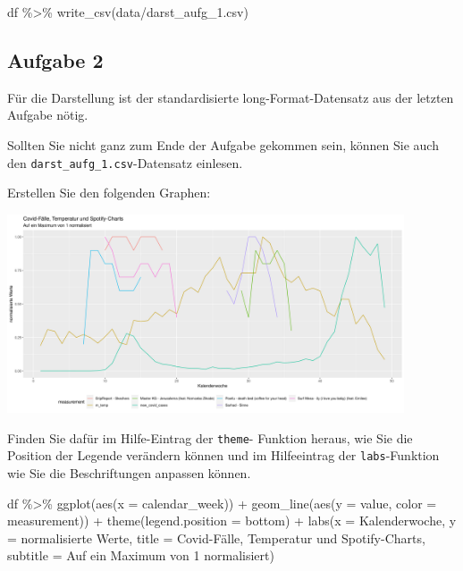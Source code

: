 \documentclass[
]{book}
\newenvironment{Shaded}{\begin{snugshade}}{\end{snugshade}}
\newcommand{\AttributeTok}[1]{\textcolor[rgb]{0.77,0.63,0.00}{#1}}
\newcommand{\FunctionTok}[1]{\textcolor[rgb]{0.00,0.00,0.00}{#1}}
\newcommand{\NormalTok}[1]{#1}
\newcommand{\SpecialCharTok}[1]{\textcolor[rgb]{0.00,0.00,0.00}{#1}}
\newcommand{\StringTok}[1]{\textcolor[rgb]{0.31,0.60,0.02}{#1}}
\begin{document}
\begin{Shaded}
\begin{Highlighting}[]
\NormalTok{df }\SpecialCharTok{\%\textgreater{}\%} 
  \FunctionTok{write\_csv}\NormalTok{(}\StringTok{\textquotesingle{}data/darst\_aufg\_1.csv\textquotesingle{}}\NormalTok{)}
\end{Highlighting}
\end{Shaded}

\hypertarget{aufgabe-2-4}{%
\subsection{Aufgabe 2}\label{aufgabe-2-4}}

Für die Darstellung ist der standardisierte long-Format-Datensatz aus der letzten Aufgabe nötig.

Sollten Sie nicht ganz zum Ende der Aufgabe gekommen sein, können Sie auch den \texttt{darst\_aufg\_1.csv}-Datensatz einlesen.

Erstellen Sie den folgenden Graphen:

\begin{center}\includegraphics[width=333.333333333333pt]{imgs/task_ts} \end{center}

Finden Sie dafür im Hilfe-Eintrag der \texttt{theme}- Funktion heraus, wie Sie die Position der Legende verändern können und im Hilfeeintrag der \texttt{labs}-Funktion wie Sie die Beschriftungen anpassen können.

\hypertarget{solution2}{}
\begin{Shaded}
\begin{Highlighting}[]
\NormalTok{df }\SpecialCharTok{\%\textgreater{}\%} 
  \FunctionTok{ggplot}\NormalTok{(}\FunctionTok{aes}\NormalTok{(}\AttributeTok{x =}\NormalTok{ calendar\_week)) }\SpecialCharTok{+}
  \FunctionTok{geom\_line}\NormalTok{(}\FunctionTok{aes}\NormalTok{(}\AttributeTok{y =}\NormalTok{ value, }\AttributeTok{color =}\NormalTok{ measurement)) }\SpecialCharTok{+}
  \FunctionTok{theme}\NormalTok{(}\AttributeTok{legend.position =} \StringTok{\textquotesingle{}bottom\textquotesingle{}}\NormalTok{) }\SpecialCharTok{+}
  \FunctionTok{labs}\NormalTok{(}\AttributeTok{x =} \StringTok{\textquotesingle{}Kalenderwoche\textquotesingle{}}\NormalTok{,}
       \AttributeTok{y =} \StringTok{\textquotesingle{}normalisierte Werte\textquotesingle{}}\NormalTok{,}
       \AttributeTok{title =} \StringTok{\textquotesingle{}Covid{-}Fälle, Temperatur und Spotify{-}Charts\textquotesingle{}}\NormalTok{,}
       \AttributeTok{subtitle =} \StringTok{\textquotesingle{}Auf ein Maximum von 1 normalisiert\textquotesingle{}}\NormalTok{)}
\end{Highlighting}
\end{Shaded}
\end{document}
